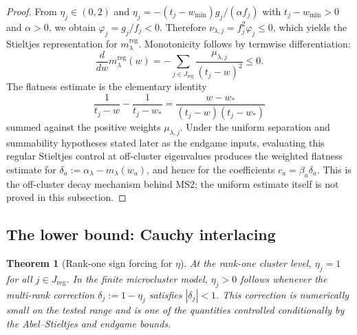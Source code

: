 \documentclass[12pt,a4paper]{article}
\newtheorem{theorem}{Theorem}[section]
\theoremstyle{definition}
\theoremstyle{remark}
\newcommand{\reg}{\mathrm{reg}}
\newcommand{\wmin}{w_{\min}}
\begin{document}
\begin{proof}
From $\eta_j \in (0,2)$ and
$\eta_j = -(t_j-\wmin)g_j/(\alpha f_j)$ with $t_j-\wmin>0$ and
$\alpha>0$, we obtain $\varphi_j = g_j/f_j < 0$.  Therefore
$\nu_{\lambda,j} = f_j^2 \varphi_j \le 0$, which yields the Stieltjes
representation for $m_\lambda^{\reg}$.  Monotonicity follows by
termwise differentiation:
\[
  \frac{d}{dw} m_\lambda^{\reg}(w)
  =
  -\sum_{j\in J_{\reg}}
  \frac{\mu_{\lambda,j}}{(t_j-w)^2}
  \le 0.
\]
The flatness estimate is the elementary identity
\[
  \frac{1}{t_j-w} - \frac{1}{t_j-w_\ast}
  =
  \frac{w-w_\ast}{(t_j-w)(t_j-w_\ast)}
\]
summed against the positive weights $\mu_{\lambda,j}$.  Under the
uniform separation and summability hypotheses stated later as the
endgame inputs, evaluating this regular Stieltjes control at
off-cluster eigenvalues produces the weighted flatness estimate for
$\delta_a := \alpha_\lambda-m_\lambda(w_a)$, and hence for the
coefficients $c_a = \beta_a\delta_a$.  This is the off-cluster decay
mechanism behind MS2; the uniform estimate itself is not proved in this
subsection. \qedhere
\end{proof}

\subsection{The lower bound: Cauchy interlacing}

\begin{theorem}[Rank-one sign forcing for $\eta$]
\label{thm:eta-positive}
At the rank-one cluster level, $\eta_j=1$ for all
$j\in J_{\reg}$.  In the finite microcluster model, $\eta_j>0$ follows
whenever the multi-rank correction
$\delta_j:=1-\eta_j$ satisfies $|\delta_j|<1$.  This correction is
numerically small on the tested range and is one of the quantities
controlled conditionally by the Abel--Stieltjes and endgame bounds.
\end{theorem}
\end{document}
